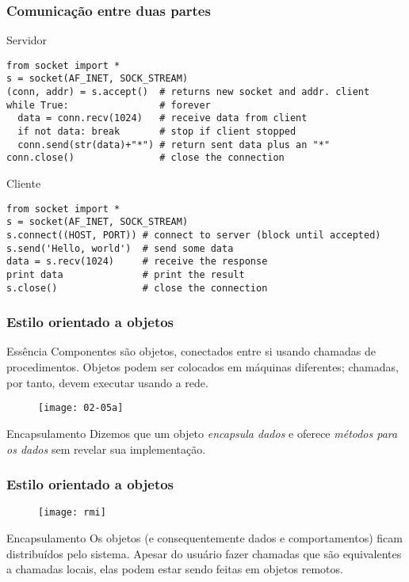 \documentclass[Ligatures=TeX,table,brazil,svgnames,usetotalslideindicator,compress,10pt]{beamer}
\begin{document}
\begin{frame}[fragile]
  \frametitle{Comunicação entre duas partes}
  \begin{exampleblock}{Servidor}
    \scriptsize
\begin{verbatim}
from socket import *
s = socket(AF_INET, SOCK_STREAM)
(conn, addr) = s.accept()  # returns new socket and addr. client
while True:                # forever
  data = conn.recv(1024)   # receive data from client
  if not data: break       # stop if client stopped
  conn.send(str(data)+"*") # return sent data plus an "*"
conn.close()               # close the connection
\end{verbatim}
  \end{exampleblock}
  \begin{exampleblock}{Cliente}
        \scriptsize
\begin{verbatim}
from socket import *
s = socket(AF_INET, SOCK_STREAM)
s.connect((HOST, PORT)) # connect to server (block until accepted)
s.send('Hello, world')  # send some data
data = s.recv(1024)     # receive the response
print data              # print the result
s.close()               # close the connection
\end{verbatim}
  \end{exampleblock}
\end{frame}

\begin{frame}
  \frametitle{Estilo orientado a objetos}
  \begin{block}{Essência}
    Componentes são objetos, conectados entre si usando chamadas de procedimentos. Objetos podem ser colocados em máquinas diferentes; chamadas, por tanto, devem executar usando a rede.
  \end{block}

  \begin{figure}
    \centering
    \texttt{[image: 02-05a]}
  \end{figure}

  \begin{block}{Encapsulamento}
    Dizemos que um objeto \emph{encapsula dados} e oferece \emph{métodos para os dados} sem revelar sua implementação.
  \end{block}
\end{frame}


\begin{frame}
  \frametitle{Estilo orientado a objetos}
  \begin{figure}
    \centering
    \texttt{[image: rmi]}
  \end{figure}

  \begin{block}{Encapsulamento}
    Os objetos (e consequentemente dados e comportamentos) ficam
    distribuídos pelo sistema. Apesar do usuário fazer chamadas que
    são equivalentes a chamadas locais, elas podem estar sendo feitas
    em \alert{objetos remotos}.
  \end{block}
\end{frame}
\end{document}

